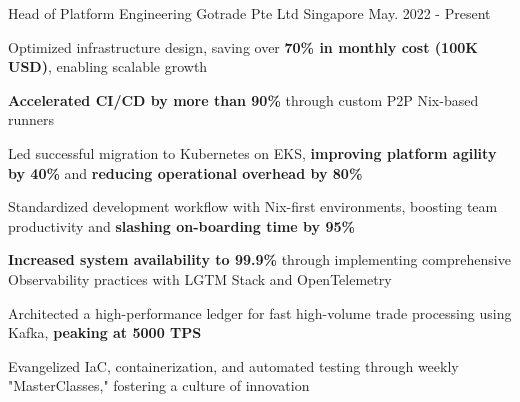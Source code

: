 

\begin{cventries}


    \cventry
    {Head of Platform Engineering} %
    {Gotrade Pte Ltd} %
    {Singapore} %
    {May. 2022 - Present} %
    {
    \begin{cvitems} %
        \item {Optimized infrastructure design, saving over \textbf{70\% in monthly cost (100K USD)}, enabling scalable growth}
        \item {\textbf{Accelerated CI/CD by more than 90\%} through custom P2P Nix-based runners}
        \item {Led successful migration to Kubernetes on EKS, \textbf{improving platform agility by 40\%} and \textbf{reducing operational overhead by 80\%}}
        \item {Standardized development workflow with Nix-first environments, boosting team productivity and \textbf{slashing on-boarding time by 95\%}}
        \item {\textbf{Increased system availability to 99.9\%} through implementing comprehensive Observability practices with LGTM Stack and OpenTelemetry}
        \item {Architected a high-performance ledger for fast high-volume trade processing using Kafka, \textbf{peaking at 5000 TPS}}
        \item {Evangelized IaC, containerization, and automated testing through weekly "MasterClasses," fostering a culture of innovation}
    \end{cvitems}
    }


\end{cventries}

